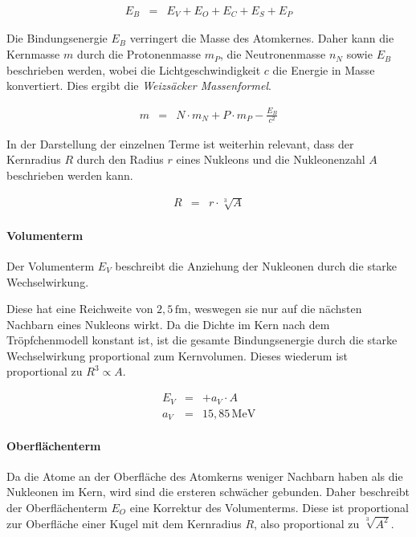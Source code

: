 \documentclass[12pt,a4paper]{scrartcl}
\numberwithin{equation}{section} %
\begin{document}
\begin{eqnarray}
	E_B &=& E_V + E_O + E_C + E_S + E_P
\end{eqnarray}

\noindent
Die Bindungsenergie $E_B$ verringert die Masse des Atomkernes. Daher kann die Kernmasse $m$ durch die Protonenmasse $m_P$, die Neutronenmasse $n_N$ sowie $E_B$ beschrieben werden, wobei die Lichtgeschwindigkeit $c$ die Energie in Masse konvertiert. Dies ergibt die \emph{Weizsäcker Massenformel}.

\begin{eqnarray}
	m &=& N\cdot m_N + P\cdot m_P - \frac{E_B}{c^2} \label{eq:Massenformel}
\end{eqnarray}

\noindent
In der Darstellung der einzelnen Terme ist weiterhin relevant, dass der Kernradius $R$ durch den Radius $r$ eines Nukleons und die Nukleonenzahl $A$ beschrieben werden kann.

\begin{eqnarray}
	R &=& r \cdot \sqrt[3]{A}
\end{eqnarray}

\hypertarget{volumenterm}{%
	\paragraph{Volumenterm}\label{volumenterm}}

Der Volumenterm $E_V$ beschreibt die Anziehung der Nukleonen durch die starke Wechselwirkung.

Diese hat eine Reichweite von $2,5\mathrm{\,fm}$, weswegen sie nur auf die nächsten Nachbarn eines Nukleons wirkt. Da die Dichte im Kern nach dem Tröpfchenmodell konstant ist, ist die gesamte Bindungsenergie durch die starke Wechselwirkung proportional zum Kernvolumen. Dieses wiederum ist proportional zu $R^3\propto A$.

\begin{eqnarray}
	E_V &=& + a_V\cdot A \label{Volumenterm} \\
	a_V &=& 15,85\mathrm{\,MeV}
\end{eqnarray}

\hypertarget{oberfluxe4chenterm}{%
	\paragraph{Oberflächenterm}\label{oberfluxe4chenterm}}

Da die Atome an der Oberfläche des Atomkerns weniger Nachbarn haben als die Nukleonen im Kern, wird sind die ersteren schwächer gebunden. Daher beschreibt der Oberflächenterm $E_O$ eine Korrektur des Volumenterms. Diese ist proportional zur Oberfläche einer Kugel mit dem Kernradius $R$, also proportional zu $\sqrt[3]{A^2}$.
\end{document}
